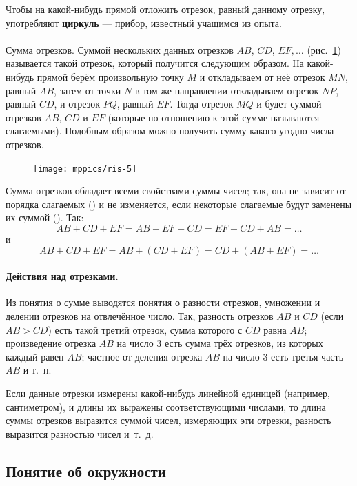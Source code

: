 \documentclass[oneside]{book}
\begin{document}
Чтобы на какой-нибудь прямой отложить отрезок, равный данному отрезку, употребляют \textbf{циркуль} — прибор, известный учащимся из опыта.

\paragraph{}\label{1938/7}
Сумма отрезков.
Суммой нескольких данных отрезков $AB$, $CD$, $EF,\dots$
(рис.~\ref{1938/ris-5}) называется такой отрезок, который получится следующим образом.
На какой-нибудь прямой берём произвольную точку $M$ и откладываем от неё отрезок $MN$, равный $AB$, затем от точки $N$ в том же направлении откладываем отрезок $NP$, равный $CD$, и отрезок $PQ$, равный $EF$.
Тогда отрезок $MQ$ и будет суммой отрезков $AB$, $CD$ и $EF$ (которые по отношению к этой сумме называются слагаемыми).
Подобным образом можно получить сумму какого угодно числа отрезков.

\begin{figure}[h!]
\centering
\texttt{[image: mppics/ris-5]}
\caption{}\label{1938/ris-5}
\end{figure}

Сумма отрезков обладает всеми свойствами суммы чисел;
так, она не зависит от порядка слагаемых () и не изменяется, если некоторые слагаемые будут заменены их суммой ().
Так:
\[AB+CD+EF=AB+EF+CD=EF+CD+AB=\dots\]
и
\[AB+CD+EF=AB+(CD+EF)=CD+(AB+EF)=\dots\]

\paragraph{Действия над отрезками.}\label{1938/8}
Из понятия о сумме выводятся понятия о разности отрезков, умножении и делении отрезков на отвлечённое число.
Так, разность отрезков $AB$ и $CD$ (если $AB>CD$) есть такой третий отрезок, сумма которого с $CD$ равна $AB$;
произведение отрезка $AB$ на число $3$ есть сумма трёх отрезков, из которых каждый равен $AB$;
частное от деления отрезка $AB$ на число $3$ есть третья часть $AB$ и т.~п.

Если данные отрезки измерены какой-нибудь линейной единицей (например, сантиметром), и длины их выражены соответствующими числами, то длина суммы отрезков выразится суммой чисел, измеряющих эти отрезки, разность выразится разностью чисел и~т.~д.

\subsection*{Понятие об окружности}
\end{document}
